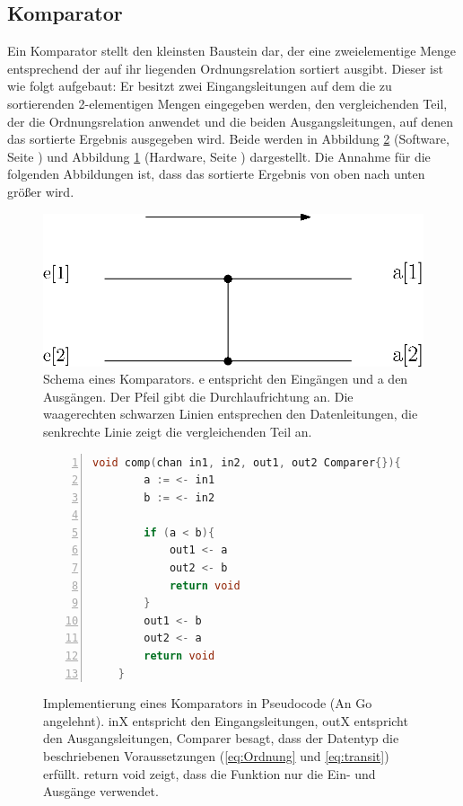 \documentclass[11pt,ngerman]{article}
\begin{document}
\subsection{Komparator}
Ein Komparator stellt den kleinsten Baustein dar, der eine zweielementige Menge entsprechend der auf ihr liegenden Ordnungsrelation sortiert ausgibt. Dieser ist wie folgt aufgebaut: Er besitzt zwei Eingangsleitungen auf dem die zu sortierenden 2-elementigen Mengen eingegeben werden, den vergleichenden Teil, der die Ordnungsrelation anwendet und die beiden Ausgangsleitungen, auf denen das sortierte Ergebnis ausgegeben wird. Beide werden in Abbildung \ref{fig:kompsoft} (Software, Seite \pageref{fig:kompsoft}) und Abbildung \ref{fig:komparator} (Hardware, Seite \pageref{fig:komparator}) dargestellt. Die Annahme für die folgenden Abbildungen ist, dass das sortierte Ergebnis von oben nach unten größer wird.
\begin{figure}
\begin{center}
\includegraphics[scale=0.8]{Komparator1.eps}
\end{center}
\caption{Schema eines Komparators. e entspricht den Eingängen und a den Ausgängen. Der Pfeil gibt die Durchlaufrichtung an. Die waagerechten schwarzen Linien entsprechen den Datenleitungen, die senkrechte Linie zeigt die vergleichenden Teil an.}
\label{fig:komparator}
\end{figure}
\begin{figure}
\begin{center}
\begin{lstlisting}[language=C,tabsize=4,numbers=left]
    void comp(chan in1, in2, out1, out2 Comparer{}){
        a := <- in1
        b := <- in2
        
        if (a < b){
            out1 <- a
            out2 <- b
            return void
        }
        out1 <- b
        out2 <- a
        return void
    }
\end{lstlisting}
\caption{Implementierung eines Komparators in Pseudocode (An Go angelehnt). inX entspricht den Eingangsleitungen, outX entspricht den Ausgangsleitungen, Comparer besagt, dass der Datentyp die beschriebenen Voraussetzungen (\eqref{eq:Ordnung} und \eqref{eq:transit}) erfüllt. \glqq return void\grqq{} zeigt, dass die Funktion nur die Ein- und Ausgänge verwendet.}
\label{fig:kompsoft}
\end{center}
\end{figure}
\end{document}
